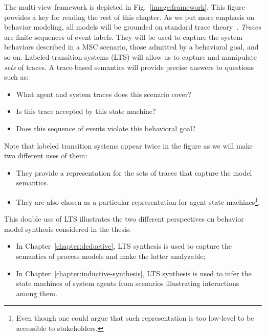 The multi-view framework is depicted in Fig.~\ref{image:framework}. This figure provides a key for reading the rest of this chapter. As we put more emphasis on behavior modeling, all models will be grounded on standard trace theory~\cite{Hoare:1985}. \emph{Traces} are finite sequences of event labels. They will be used to capture the system behaviors described in a MSC scenario, those admitted by a behavioral goal, and so on. Labeled transition systems (LTS) will allow us to capture and manipulate \emph{sets} of traces. A trace-based semantics will provide precise answers to questions such as:
\begin{itemize} 
\item What agent and system traces does this scenario cover?
\item Is this trace accepted by this state machine?
\item Does this sequence of events violate this behavioral goal?
\end{itemize}

Note that labeled transition systems appear twice in the figure as we will make two different uses of them:
\begin{itemize} 
\item They provide a representation for the sets of traces that capture the model semantics. 
\item They are also chosen as a particular representation for agent state machines\footnote{Even though one could argue that such representation is too low-level to be accessible to stakeholders.}.
\end{itemize}

This double use of LTS illustrates the two different perspectives on behavior model synthesis considered in the thesis:
\begin{itemize}
\item In Chapter~\ref{chapter:deductive}, LTS synthesis is used to capture the semantics of process models and make the latter analyzable;
\item In Chapter~\ref{chapter:inductive-synthesis}, LTS synthesis is used to infer the state machines of system agents from scenarios illustrating interactions among them.
\end{itemize}

